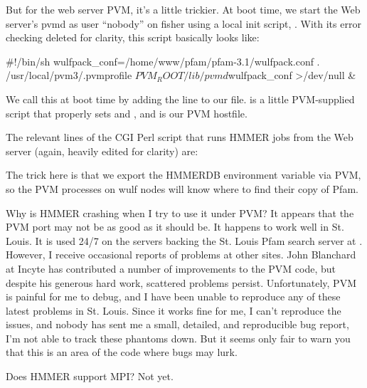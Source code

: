 But for the web server PVM, it's a little trickier. At boot time, we
start the Web server's pvmd as user ``nobody'' on fisher using a local
init script, . With its error
checking deleted for clarity, this script basically looks like:

\begin{sreoutput}
#!/bin/sh
wulfpack_conf=/home/www/pfam/pfam-3.1/wulfpack.conf
. /usr/local/pvm3/.pvmprofile
$PVM_ROOT/lib/pvmd $wulfpack_conf >/dev/null &
\end{sreoutput}

We call this at boot time by adding the line  to our 
file.  is a little PVM-supplied script that properly
sets  and , and 
is our PVM hostfile.

The relevant lines of the CGI Perl script that runs HMMER jobs from
the Web server (again, heavily edited for clarity) are:


The trick here is that we export the HMMERDB environment variable via
PVM, so the PVM processes on wulf nodes will know where to find their
copy of Pfam.

\begin{srefaq}{Why is HMMER crashing when I try to use it under PVM?}
It appears that the PVM port may not be as good as it should be. It
happens to work well in St. Louis. It is used 24/7 on the servers
backing the St. Louis Pfam search server at
.
However, I receive occasional reports of problems at other
sites. John Blanchard at Incyte has contributed a number of
improvements to the PVM code, but despite his generous hard work, scattered problems
persist. Unfortunately, PVM is painful for me to debug, and I have been
unable to reproduce any of these latest problems in St. Louis. Since it works
fine for me, I can't reproduce the issues, and nobody has sent me a small,
detailed, and reproducible bug report, I'm not able to track these
phantoms down. But it seems only fair to warn you that this is an area
of the code where bugs may lurk.
\end{srefaq}

\begin{srefaq}{Does HMMER support MPI?}
Not yet.
\end{srefaq}








